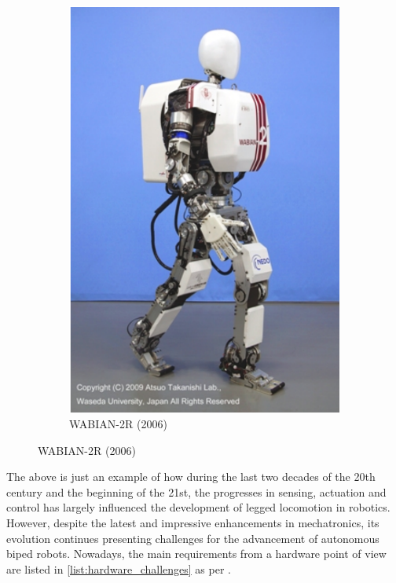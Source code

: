 \begin{figure}[htb]
\begin{subfigure}[b]{0.4\textwidth}
        \includegraphics[width=\textwidth]{figures/waseda2.pdf}
        \caption{WABIAN-2R (2006)}
        \label{fig:waseda_robot2}
    \end{subfigure}
\end{figure}

The above is just an example of how during the last two decades of the 20th century and the beginning of the 21st, the progresses in sensing, actuation and control has largely influenced the development of legged locomotion in robotics.
However, despite the latest and impressive enhancements in mechatronics, its evolution continues presenting challenges for the advancement of autonomous biped robots.
Nowadays, the main requirements from a hardware point of view are listed in \ref{list:hardware_challenges} as per \cite{biped_robots_history}.

